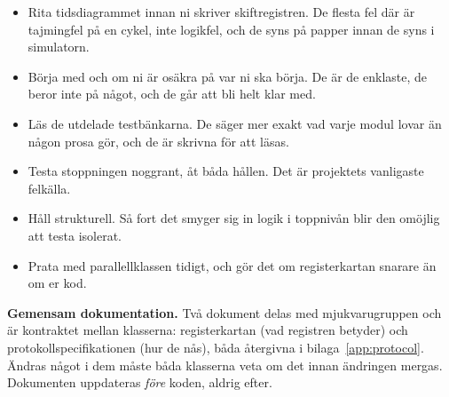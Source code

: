 \begin{itemize}
  \item Rita tidsdiagrammet innan ni skriver skiftregistren. De flesta fel där är tajmingfel på en
    cykel, inte logikfel, och de syns på papper innan de syns i simulatorn.
  \item Börja med  och  om ni är osäkra på var ni ska börja. De är de
    enklaste, de beror inte på något, och de går att bli helt klar med.
  \item Läs de utdelade testbänkarna. De säger mer exakt vad varje modul lovar än någon prosa gör,
    och de är skrivna för att läsas.
  \item Testa stoppningen noggrant, åt båda hållen. Det är projektets vanligaste felkälla.
  \item Håll  strukturell. Så fort det smyger sig in logik i toppnivån blir den
    omöjlig att testa isolerat.
  \item Prata med parallellklassen tidigt, och gör det om registerkartan snarare än om er kod.
\end{itemize}

\begin{aside}
\textbf{Gemensam dokumentation.} Två dokument delas med mjukvarugruppen och är kontraktet mellan
klasserna: registerkartan (vad registren betyder) och protokollspecifikationen (hur de nås), båda
återgivna i bilaga~\ref{app:protocol}. Ändras något i dem måste båda klasserna veta om det innan
ändringen mergas. Dokumenten uppdateras \emph{före} koden, aldrig efter.
\end{aside}

